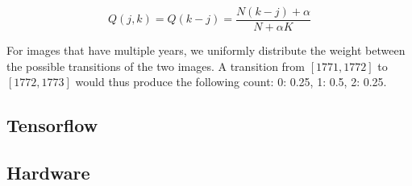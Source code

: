 \[
Q(j, k) = Q(k-j) = \frac{N(k-j) + \alpha}{N + \alpha K}
\]

For images that have multiple years, we uniformly distribute the weight between the possible transitions of the two images. A transition from $[1771, 1772]$ to $[1772, 1773]$ would thus produce the following count: {0: 0.25, 1: 0.5, 2: 0.25}.


\subsection{Tensorflow}


\subsection{Hardware}

